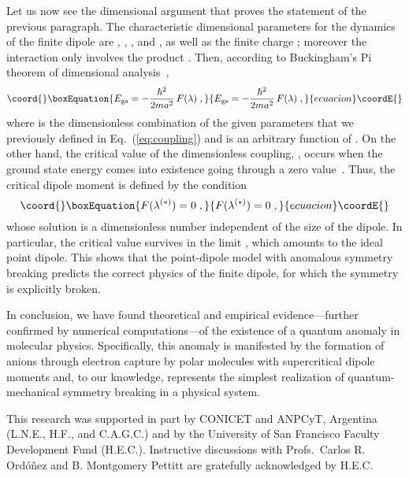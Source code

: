 \documentclass[a4paper,twocolumn,
showpacs,amssymb,aps,prl,superscriptaddress]{revtex4}%
\begin{document}
Let us now see the dimensional argument
that proves the statement of the previous paragraph. The
characteristic dimensional parameters for the dynamics of the
finite dipole are \myHighlight{$\hbar$}\coordHE{}, \coordHE{}, \coordHE{}, and \coordHE{}, as well as the
finite charge \coordHE{}; moreover the interaction only involves the
product \coordHE{}.
 Then, according to Buckingham's Pi theorem of
dimensional analysis~\cite{pi_theorem},
\begin{equation}\coord{}\boxEquation{
E_{\rm gs} = - \frac{\hbar^{2}}{2m a^{2}} \, F (\lambda) \;  ,
}{
E_{\rm gs} = - \frac{\hbar^{2}}{2m a^{2}} \, F (\lambda) \;  ,
}{ecuacion}\coordE{}\end{equation}
where \myHighlight{$\lambda $}\coordHE{} is the dimensionless combination of the given
parameters that we previously defined in Eq.~(\ref{eq:coupling})
and \coordHE{} is an arbitrary function of \myHighlight{$\lambda$}\coordHE{}. On the
other hand, the critical value of the dimensionless coupling,
\myHighlight{$\lambda^{(*)}$}\coordHE{}, occurs when the ground state energy \coordHE{}
comes into existence going through a 
zero value~\cite{energy_subtlety}. 
Thus, the critical dipole moment is defined by
the condition
\begin{equation}\coord{}\boxEquation{
F(\lambda^{(*)}) =0 \;  ,
}{
F(\lambda^{(*)}) =0 \;  ,
}{ecuacion}\coordE{}\end{equation}
whose solution is a dimensionless number independent of the size
\coordHE{} of the dipole. In particular, the critical value survives in
the limit \coordHE{}, which amounts to the ideal point
dipole. This shows that the point-dipole model with anomalous
symmetry breaking predicts the correct physics of the finite
dipole, for which the symmetry is explicitly broken.

In conclusion, we have found theoretical and empirical
evidence---further confirmed by numerical computations---of the
existence of a quantum anomaly in molecular physics.
Specifically, this anomaly is manifested by the formation of
anions through electron capture by polar molecules with
supercritical dipole moments and, to our knowledge, represents
the simplest realization of quantum-mechanical symmetry breaking
in a physical system.

 This research was supported in part by CONICET and ANPCyT,
Argentina (L.N.E., H.F., and C.A.G.C.) and by the University of
San Francisco Faculty Development Fund (H.E.C.). Instructive
discussions with Profs.\ Carlos R. Ord\'{o}\~{n}ez and B. Montgomery
Pettitt are gratefully acknowledged by H.E.C.
\end{document}

